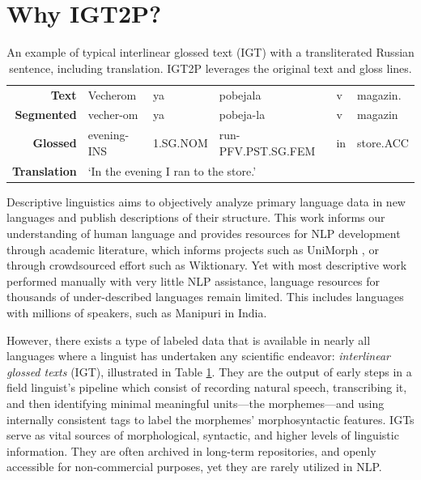 \section{Why IGT2P?}

\begin{table}[]
    \centering
    \begin{tabular}{rlllll}
       \textbf{Text}  & Vecherom & ya & pobejala & v & magazin. \\
      \textbf{Segmented}   & vecher-om & ya & pobeja-la & v & magazin \\
      \textbf{Glossed} & evening-INS & 1.SG.NOM & run-PFV.PST.SG.FEM & in & store.ACC \\
      \textbf{Translation} & \multicolumn{5}{l}{`In the evening I ran to the store.'}
    \end{tabular}
    \caption[IGT example]{An example of typical interlinear glossed text (IGT) with a transliterated Russian sentence, including translation. IGT2P leverages the original text and gloss lines.}
    \label{tab:IGT}
\end{table}


Descriptive linguistics aims to objectively analyze primary language data in new languages and publish descriptions of their structure. This work informs our understanding of human language and provides resources for NLP development through academic literature, which informs projects such as UniMorph \citep{kirov_unimorph}, or through crowdsourced effort such as Wiktionary. Yet with most descriptive work performed manually with very little NLP assistance, language resources for thousands of under-described languages remain limited. This includes languages with millions of speakers, such as Manipuri in India.

However, there exists a type of labeled data that is available in nearly all languages where a linguist has undertaken any scientific endeavor: \textit{interlinear glossed texts} (IGT), illustrated in Table \ref{tab:IGT}. They are the output of early steps in a field linguist's pipeline which consist of recording natural speech, transcribing it, and then identifying minimal meaningful units---the morphemes---and using internally consistent tags to label the morphemes' morphosyntactic features. IGTs serve as vital sources of morphological, syntactic, and higher levels of linguistic information. They are often archived in long-term repositories, and openly accessible for non-commercial purposes, yet they are rarely utilized in NLP.

